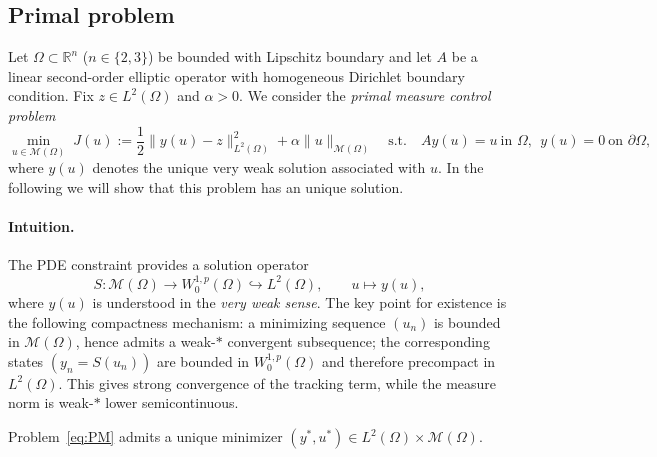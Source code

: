 \documentclass[11pt,a4paper]{article}
\begin{document}
\subsection{Primal problem}
Let $\Omega\subset\mathbb{R}^n$ ($n\in\{2,3\}$) be bounded with Lipschitz boundary and let $A$ be a linear second-order elliptic operator with homogeneous Dirichlet boundary condition.
Fix $z\in L^2(\Omega)$ and $\alpha>0$.
We consider the \emph{primal measure control problem}
\begin{equation}\label{eq:PM}
\tag{$P_M$}
\min_{u\in\mathcal{M}(\Omega)}\;
J(u):=\frac12\|y(u)-z\|_{L^2(\Omega)}^2+\alpha\|u\|_{\mathcal{M}(\Omega)}
\quad\text{s.t.}\quad Ay(u)=u \ \text{in }\Omega,\ \ y(u)=0 \ \text{on }\partial\Omega,
\end{equation}
where $y(u)$ denotes the unique very weak solution associated with $u$. In the following we will show that this problem has an unique solution.

\paragraph{Intuition.}
The PDE constraint provides a solution operator
\[
S:\mathcal{M}(\Omega)\to W^{1,p}_0(\Omega)\hookrightarrow L^2(\Omega),
\qquad u\mapsto y(u),
\]
where $y(u)$ is understood in the \emph{very weak sense}.
The key point for existence is the following compactness mechanism:
a minimizing sequence $(u_n)$ is bounded in $\mathcal{M}(\Omega)$, hence admits a weak-$*$ convergent subsequence;
the corresponding states $(y_n=S(u_n))$ are bounded in $W^{1,p}_0(\Omega)$ and therefore precompact in $L^2(\Omega)$.
This gives strong convergence of the tracking term, while the measure norm is weak-$*$ lower semicontinuous.

\begin{proposition}\label{prop:exist_PM}
Problem~\eqref{eq:PM} admits a unique minimizer $(y^*,u^*)\in L^2(\Omega)\times\mathcal{M}(\Omega)$.
\end{proposition}
\end{document}

